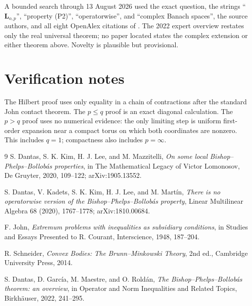 \documentclass[11pt]{article}
\begin{document}
A bounded search through 13 August 2026 used the exact question, the strings
``$\mathbf L_{o,p}$'', ``property (P2)'', ``operatorwise'', and ``complex
Banach spaces'', the source authors, and all eight OpenAlex citations of
\cite{DKKLM}.  The 2022 expert overview \cite{Overview} restates only the
real universal theorem; no paper located states the complex extension or
either theorem above.  Novelty is plausible but provisional.

\section{Verification notes}

The Hilbert proof uses only equality in a chain of contractions after the
standard John contact theorem.  The $p\le q$ proof is an exact diagonal
calculation.  The $p>q$ proof uses no numerical evidence: the only limiting
step is uniform first-order expansion near a compact torus on which both
coordinates are nonzero.  This includes $q=1$; compactness also includes
$p=\infty$.

\begin{thebibliography}{9}
S. Dantas, S. K. Kim, H. J. Lee, and M. Mazzitelli,
\emph{On some local Bishop--Phelps--Bollob\'as properties},
in The Mathematical Legacy of Victor Lomonosov, De Gruyter, 2020,
109--122; arXiv:1905.13552.

S. Dantas, V. Kadets, S. K. Kim, H. J. Lee, and M. Mart\'in,
\emph{There is no operatorwise version of the
Bishop--Phelps--Bollob\'as property},
Linear Multilinear Algebra 68 (2020), 1767--1778;
arXiv:1810.00684.

F. John, \emph{Extremum problems with inequalities as subsidiary
conditions}, in Studies and Essays Presented to R. Courant, Interscience,
1948, 187--204.

R. Schneider, \emph{Convex Bodies: The Brunn--Minkowski Theory},
2nd ed., Cambridge University Press, 2014.

S. Dantas, D. Garc\'ia, M. Maestre, and O. Rold\'an,
\emph{The Bishop--Phelps--Bollob\'as theorem: an overview},
in Operator and Norm Inequalities and Related Topics, Birkh\"auser, 2022,
241--295.
\end{thebibliography}
\end{document}
